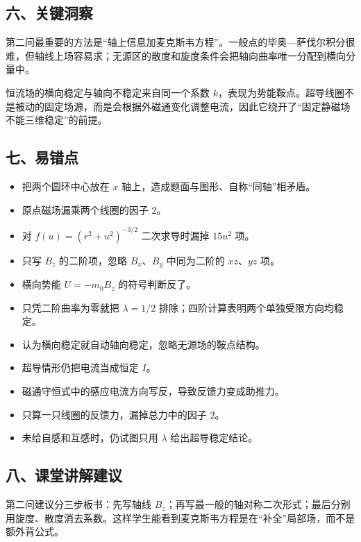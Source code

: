 \documentclass[12pt,a4paper,UTF8]{ctexart}
\newcommand{\tightlist}{\setlength{\itemsep}{0pt}\setlength{\parskip}{0pt}}
\begin{document}
\subsection{六、关键洞察}\label{ux516dux5173ux952eux6d1eux5bdf-5}

第二问最重要的方法是``轴上信息加麦克斯韦方程''。一般点的毕奥---萨伐尔积分很难，但轴线上场容易求；无源区的散度和旋度条件会把轴向曲率唯一分配到横向分量中。

恒流场的横向稳定与轴向不稳定来自同一个系数
\(k\)，表现为势能鞍点。超导线圈不是被动的固定场源，而是会根据外磁通变化调整电流，因此它绕开了``固定静磁场不能三维稳定''的前提。

\subsection{七、易错点}\label{ux4e03ux6613ux9519ux70b9-5}

\begin{itemize}
\tightlist
\item
  把两个圆环中心放在 \(x\) 轴上，造成题面与图形、自称``同轴''相矛盾。
\item
  原点磁场漏乘两个线圈的因子 \(2\)。
\item
  对 \(f(u)=(r^2+u^2)^{-3/2}\) 二次求导时漏掉 \(15u^2\) 项。
\item
  只写 \(B_z\) 的二阶项，忽略 \(B_x\)、\(B_y\) 中同为二阶的
  \(xz\)、\(yz\) 项。
\item
  横向势能 \(U=-m_0B_z\) 的符号判断反了。
\item
  只凭二阶曲率为零就把 \(\lambda=1/2\)
  排除；四阶计算表明两个单独受限方向均稳定。
\item
  认为横向稳定就自动轴向稳定，忽略无源场的鞍点结构。
\item
  超导情形仍把电流当成恒定 \(I\)。
\item
  磁通守恒式中的感应电流方向写反，导致反馈力变成助推力。
\item
  只算一只线圈的反馈力，漏掉总力中的因子 \(2\)。
\item
  未给自感和互感时，仍试图只用 \(\lambda\) 给出超导稳定结论。
\end{itemize}

\subsection{八、课堂讲解建议}\label{ux516bux8bfeux5802ux8bb2ux89e3ux5efaux8bae-5}

第二问建议分三步板书：先写轴线
\(B_z\)；再写最一般的轴对称二次形式；最后分别用旋度、散度消去系数。这样学生能看到麦克斯韦方程是在``补全''局部场，而不是额外背公式。
\end{document}
